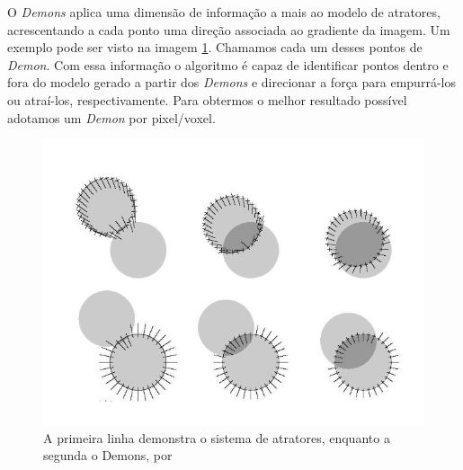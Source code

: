     O \textit{Demons} aplica uma dimensão de informação a mais ao modelo de atratores, acrescentando a cada ponto uma direção
associada ao gradiente da imagem. Um exemplo pode ser visto na imagem \ref{fig:demons}.
Chamamos cada um desses pontos de \textit{Demon}. Com essa informação o algoritmo é capaz
de identificar pontos dentro e fora do modelo gerado a partir dos \textit{Demons} e direcionar a força para empurrá-los ou
atraí-los, respectivamente. Para obtermos o melhor resultado possível adotamos um \textit{Demon} por pixel/voxel.

\begin{figure}[H]
    \centering
    \includegraphics[width=1\textwidth]{figuras/demons.jpg}
    \caption{A primeira linha demonstra o sistema de atratores, enquanto a segunda o Demons, por \citep{thirion1995fast}}
    \label{fig:demons}
\end{figure}


